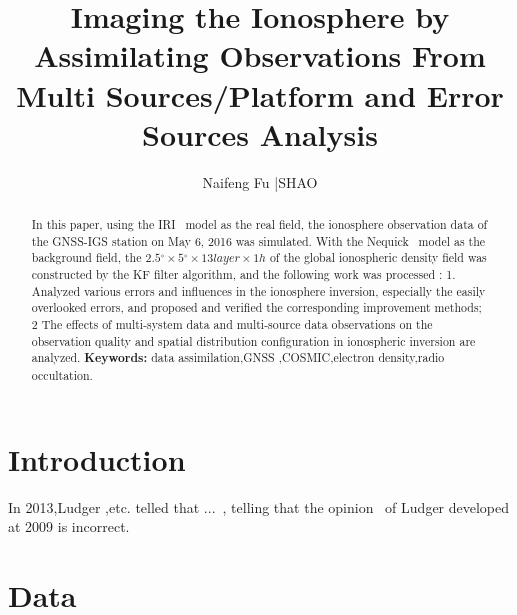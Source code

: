 \documentclass{article}
\def\degree{{}^{\circ}}
\begin{document}
\title{Imaging the Ionosphere by Assimilating Observations From Multi Sources/Platform and Error Sources Analysis}
\author{Naifeng Fu |SHAO\vspace{-2cm}}

\maketitle

\begin{abstract}
\par In this paper, using the IRI~\cite{Bilitza07} model as the real field, the ionosphere observation data of the GNSS-IGS station on May 6, 2016 was simulated. With the Nequick~\cite{Nava08} model as the background field, the $ 2.5 \degree \times 5 \degree \times 13 layer \times 1h$ of the global ionospheric density field was constructed by the KF filter algorithm, and the following work was processed : 1. Analyzed various errors and influences in the ionosphere inversion, especially the easily overlooked errors, and proposed and verified the corresponding improvement methods; 2 The effects of multi-system data and multi-source data observations on the observation quality and spatial distribution configuration in ionospheric inversion are analyzed.
\newline
\textbf{Keywords:} data assimilation,GNSS ,COSMIC,electron density,radio occultation.
\end{abstract}
\section{Introduction}
\par In 2013,Ludger ,etc. telled that ...~\cite{Galindo13}, telling that the opinion~\cite{Ludger09} of Ludger developed at 2009 is incorrect.
\section{Data}
\end{document}
